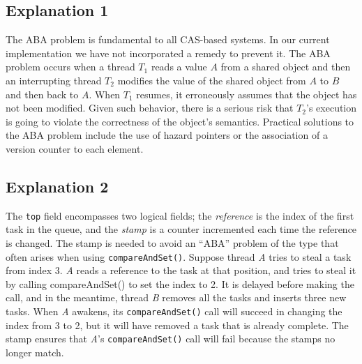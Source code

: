 \subsection{Explanation 1}

The ABA problem is fundamental to all CAS-based systems. In our
current implementation we have not incorporated a remedy to prevent
it. The ABA problem occurs when a thread $T_1$ reads a value $A$ from
a shared object and then an interrupting thread $T_2$ modifies the
value of the shared object from $A$ to $B$ and then back to $A$. When
$T_1$ resumes, it erroneously assumes that the object has not been
modified. Given such behavior, there is a serious risk that $T_2$'s
execution is going to violate the correctness of the object's
semantics. Practical solutions to the ABA problem include the use of
hazard pointers \cite{Michael2004} or the association of a version
counter to each element.

\subsection{Explanation 2}

The \lstinline!top! field encompasses two logical fields; the
\emph{reference} is the index of the first task in the queue, and the
\emph{stamp} is a counter incremented each time the reference is
changed. The stamp is needed to avoid an ``ABA'' problem of the type
that often arises when using \lstinline!compareAndSet()!. Suppose
thread \emph{A} tries to steal a task from index 3.  \emph{A} reads a
reference to the task at that position, and tries to steal it by
calling compareAndSet() to set the index to 2. It is delayed before
making the call, and in the meantime, thread \emph{B} removes all the
tasks and inserts three new tasks. When \emph{A} awakens, its
\lstinline!compareAndSet()!  call will succeed in changing the index
from 3 to 2, but it will have removed a task that is already
complete. The stamp ensures that \emph{A}'s
\lstinline!compareAndSet()! call will fail because the stamps no
longer match.


